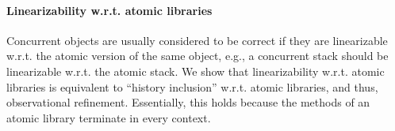 
\paragraph{Linearizability w.r.t. atomic libraries}
Concurrent objects are usually considered to be
correct if they are linearizable w.r.t. the atomic version of the same object, 
e.g., a concurrent stack should be linearizable w.r.t. the
atomic stack. 
%
%
%
%
%
%
%
%
%
We show that linearizability w.r.t. atomic libraries is equivalent to ``history inclusion'' w.r.t. atomic libraries,
and thus, observational refinement. Essentially, this holds because the methods
of an atomic library terminate in every context.

